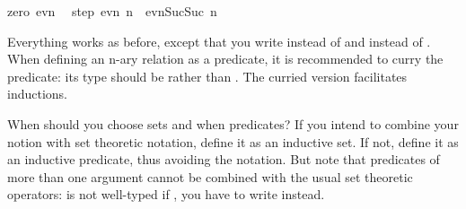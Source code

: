 \begin{isabellebody}
zero{\isacharcolon}\ {\isachardoublequoteopen}evn\ {}{\isachardoublequoteclose}\ {\isacharbar}\isanewline
step{\isacharcolon}\ {\isachardoublequoteopen}evn\ n\ {\isasymLongrightarrow}\ evn{\isacharparenleft}Suc{\isacharparenleft}Suc\ n{\isacharparenright}{\isacharparenright}{\isachardoublequoteclose}%
\begin{isamarkuptext}%
\noindent Everything works as before, except that
you write  instead of  and
 instead of .
When defining an n-ary relation as a predicate, it is recommended to curry
the predicate: its type should be \mbox{}
rather than
. The curried version facilitates inductions.

When should you choose sets and when predicates? If you intend to combine your notion with set theoretic notation, define it as an inductive set. If not, define it as an inductive predicate, thus avoiding the \isa{{\isasymin}} notation. But note that predicates of more than one argument cannot be combined with the usual set theoretic operators:  is not well-typed if , you have to write  instead.
%
\end{isamarkuptext}%
\isamarkuptrue%
%
\isadelimtheory
%
\endisadelimtheory
%
\isatagtheory
%
\endisatagtheory
{\isafoldtheory}%
%
\isadelimtheory
%
\endisadelimtheory
\end{isabellebody}%
